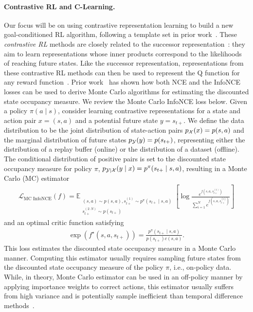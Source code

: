 \documentclass{article} %
\begin{document}
\paragraph{Contrastive RL and C-Learning.}
Our focus will be on using contrastive representation learning to build a new goal-conditioned RL algorithm, following a template set in prior work~\citep{eysenbach2022contrastive, eysenbach2020c}.
These \emph{contrastive RL} methods are closely related to the successor representation~\citep{dayan1993improving}: they aim to learn representations whose inner products correspond to the likelihoods of reaching future states.
Like the successor representation, representations from these contrastive RL methods can then be used to represent the Q function for any reward function~\citep{mazoure2022contrastive}.
Prior work~\citep{eysenbach2022contrastive} has shown how both NCE and the InfoNCE losses can be used to derive Monte Carlo algorithms for estimating the discounted state occupancy measure. We review the Monte Carlo InfoNCE loss below. Given a policy $\pi(a \mid s)$, consider learning contrastive representations for a state and action pair $x = (s, a)$ and a potential future state $y = s_{t+}$. We define the data distribution to be the joint distribution of state-action pairs $p_{{\mathcal{X}}}(x) = p(s, a)$ and the marginal distribution of future states $p_{{\mathcal{Y}}}(y) = p(s_{t+})$, representing either the distribution of a replay buffer (online) or the distribution of a dataset (offline). The conditional distribution of positive pairs is set to the discounted state occupancy measure for policy $\pi$, $p_{{\mathcal{Y}} \mid {\mathcal{X}}}(y \mid x) = p^{\pi}(s_{t+} \mid s, a)$, resulting in a Monte Carlo (MC) estimator
\begin{align}
    \mathcal{L}_{\text{MC InfoNCE}}(f) = \mathbb{E}_{\substack{(s, a) \sim p(s, a), s_{t+}^{(1)} \sim p^{\pi}(s_{t+} \mid s, a) \\ s_{t+}^{(2:N)} \sim p(s_{t+})}} \left[ \log \frac{e^{f(s, a, s_{t+}^{(1)})}}{ \sum_{i = 1}^N e^{f(s, a, s_{t+}^{(i)})} } \right]
    \label{eq:mc-infonce}
\end{align}
and an optimal critic function satisfying
\begin{align}
    \exp(f^{\star}(s, a, s_{t+})) = \frac{p^{\pi}(s_{t+} \mid s, a)}{p(s_{t+}) c(s, a)}.
    \label{eq:opt-critic}
\end{align}
This loss estimates the discounted state occupancy measure in a Monte Carlo manner. Computing this estimator usually requires sampling future states from the discounted state occupancy measure of the policy $\pi$, i.e., on-policy data. While, in theory, Monte Carlo estimator can be used in an off-policy manner by applying importance weights to correct actions, this estimator usually suffers from high variance and is potentially sample inefficient than temporal difference methods~\citep{precup2000eligibility, precup2001off}.
\end{document}

